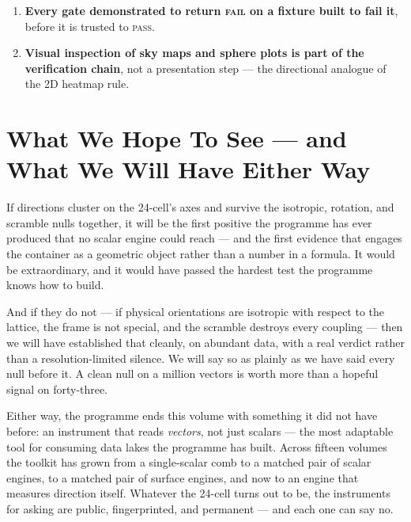 \documentclass[11pt, letterpaper, openany]{book}
\begin{document}
\begin{predictionbox}
\begin{enumerate}
          isotropic set (must null), and a \emph{selection-striped} set planted to look aligned and required to be
          rejected by the scramble --- the directional expected-fail.
    \item \textbf{Every gate demonstrated to return \textsc{fail} on a fixture built to fail it}, before it is
          trusted to \textsc{pass}.
    \item \textbf{Visual inspection of sky maps and sphere plots is part of the verification chain}, not a
          presentation step --- the directional analogue of the 2D heatmap rule.
\end{enumerate}
\end{predictionbox}

\chapter{What We Hope To See --- and What We Will Have Either Way}

\begin{signalbox}
If directions cluster on the 24-cell's axes and survive the isotropic, rotation, and scramble nulls together,
it will be the first positive the programme has ever produced that no scalar engine could reach --- and the
first evidence that engages the container as a geometric object rather than a number in a formula. It would be
extraordinary, and it would have passed the hardest test the programme knows how to build.
\end{signalbox}

\begin{nullbox}
And if they do not --- if physical orientations are isotropic with respect to the lattice, the frame is not
special, and the scramble destroys every coupling --- then we will have established that cleanly, on abundant
data, with a real verdict rather than a resolution-limited silence. We will say so as plainly as we have said
every null before it. A clean null on a million vectors is worth more than a hopeful signal on forty-three.
\end{nullbox}

Either way, the programme ends this volume with something it did not have before: an instrument that reads
\emph{vectors}, not just scalars --- the most adaptable tool for consuming data lakes the programme has built.
Across fifteen volumes the toolkit has grown from a single-scalar comb to a matched pair of scalar engines, to
a matched pair of surface engines, and now to an engine that measures direction itself. Whatever the 24-cell
turns out to be, the instruments for asking are public, fingerprinted, and permanent --- and each one can say
no.
\end{document}
